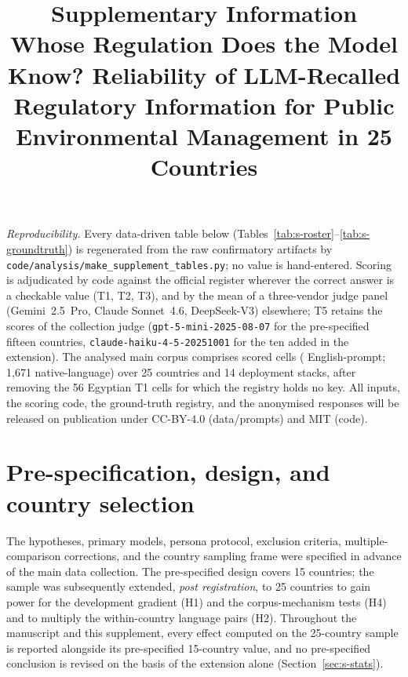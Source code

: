 \documentclass[11pt,a4paper]{article}
\title{Supplementary Information\\[0.3em]
\large Whose Regulation Does the Model Know? Reliability of LLM-Recalled\\
Regulatory Information for Public Environmental Management in 25 Countries}
\author{}
\date{}
\begin{document}
\maketitle

\noindent\emph{Reproducibility.} Every data-driven table below
(Tables~\ref{tab:s-roster}--\ref{tab:s-groundtruth}) is regenerated from the raw
confirmatory artifacts by \texttt{code/analysis/make\_supplement\_tables.py}; no
value is hand-entered. Scoring is adjudicated by code against the official
register wherever the correct answer is a checkable value (T1, T2, T3), and by
the mean of a three-vendor judge panel (Gemini~2.5~Pro, Claude Sonnet~4.6,
DeepSeek-V3) elsewhere; T5 retains the scores of the collection judge
(\texttt{gpt-5-mini-2025-08-07} for the pre-specified fifteen countries,
\texttt{claude-haiku-4-5-20251001} for the ten added in the extension). The
analysed main corpus comprises \ncells{} scored cells (\ncellsen{}
English-prompt; 1{,}671 native-language) over 25 countries and 14 deployment
stacks, after removing the 56 Egyptian T1 cells for which the registry holds no
key. All inputs, the scoring code, the
ground-truth registry, and the anonymised responses will be released on
publication under CC-BY-4.0 (data/prompts) and MIT (code).

\tableofcontents

\section{Pre-specification, design, and country selection}

The hypotheses, primary models, persona protocol, exclusion criteria,
multiple-comparison corrections, and the country sampling frame were specified in
advance of the main data collection. The pre-specified design covers
15 countries; the sample was subsequently extended, \emph{post
registration}, to 25 countries to gain power for the development gradient
(H1) and the corpus-mechanism tests (H4) and to multiply the within-country
language pairs (H2). Throughout the manuscript and this supplement, every effect
computed on the 25-country sample is reported alongside its pre-specified
15-country value, and no pre-specified conclusion is revised on the basis of the
extension alone (Section~\ref{sec:s-stats}).
\end{document}
